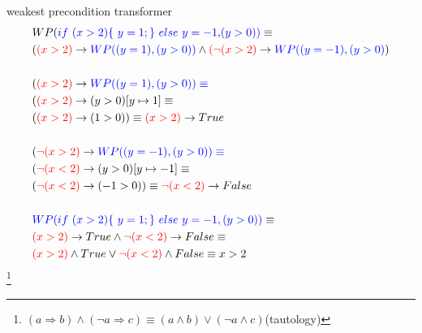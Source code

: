 \begin{frame}{weakest precondition transformer }		
\footnotesize{
\begin{equation} \label{eq1}
\begin{split}
&WP(\color{blue}if ~ (x>2)\{ ~ y=1;\} ~else ~y= -1 \textcolor{black}, (y > 0))\color{black} \equiv\\ & (\color{red}(x>2) \color{black} \rightarrow \color{blue}WP((y=1), (y>0)) \color{black}\wedge \color{red}(\neg(x>2) \color{black} \rightarrow \color{blue} WP((y=-1), (y>0)\color{black})\\\\  
&(\color{red}(x>2) \color{black} \rightarrow \color{blue}WP((y=1), (y>0)) \equiv\\
& (\color{red}(x>2) \color{black} \rightarrow(y>0)[y \mapsto 1] \equiv \\
&(\color{red}(x>2) \color{black} \rightarrow (1>0)) \equiv \color{red}(x>2) \color{black} \rightarrow True \\\\
&(\color{red}\neg(x>2) \color{black} \rightarrow \color{blue}WP((y=-1), (y>0)) \equiv\\
& (\color{red}\neg(x < 2) \color{black} \rightarrow(y>0)[y \mapsto -1] \equiv \\
&(\color{red}\neg(x < 2) \color{black} \rightarrow (-1>0)) \equiv \color{red}\neg(x < 2) \color{black} \rightarrow False\\\\
&\color{blue}WP(if ~ (x>2)\{ ~ y=1;\} ~else ~y= -1, (y > 0))\color{black} \equiv\\
&\color{red}(x>2) \color{black} \rightarrow True \wedge \color{red}\neg(x < 2) \color{black} \rightarrow False \equiv  \\ &\color{red}(x>2) \color{black} \wedge True \vee \color{red}\neg(x < 2) \color{black} \wedge False \equiv x>2\\
\end{split}
\end{equation}}
\footnote{$(a \Rightarrow b)\wedge(\neg a \Rightarrow c) \equiv (a \wedge b) \vee (\neg a \wedge c)$(tautology)}
\end{frame}


